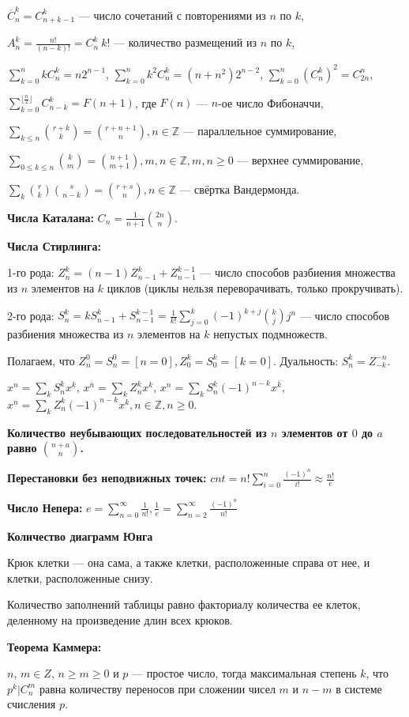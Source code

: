 $\overline{C}_n^k=C_{n + k - 1}^k$ --- число сочетаний с повторениями из $n$ по $k$,

$A_n^k=\frac{n!}{(n-k)!}=C_n^k\:k!$ --- количество размещений из $n$ по $k$,

$\sum\limits_{k=0}^{n}k C_n^k=n2^{n-1}$, $\sum\limits_{k=0}^{n}k^2 C_n^k=(n+n^2)2^{n-2}$,
$\sum\limits_{k=0}^{n}{(C_n^{k})^2}=C_{2n}^n$,

$\sum\limits_{k=0}^{\lfloor\frac{n}{2}\rfloor}C_{n-k}^k=F(n+1)$, где $F(n)$ --- $n$-ое число Фибоначчи,

$\sum\limits_{k\le n} \binom{r+k}{k}=\binom{r+n+1}{n}, n\in \mathbb{Z}$ --- параллельное суммирование,

$\sum\limits_{0\le k\le n} \binom{k}{m} = \binom{n+1}{m+1}, m, n\in \mathbb{Z}, m, n\ge 0$ --- верхнее суммирование,

$\sum\limits_k \binom{r}{k}\binom{s}{n-k}=\binom{r+s}{n}, n\in \mathbb{Z}$ --- свёртка Вандермонда.

\textbf{Числа Каталана:} $\displaystyle C_n = \frac1{n + 1}\binom{2n}{n}$.

\textbf{Числа Стирлинга:}

1-го рода: $Z_n^k =(n-1)Z_{n - 1}^k + Z_{n-1}^{k-1}$ --- число способов разбиения множества из $n$ элементов на $k$ циклов (циклы нельзя переворачивать, только прокручивать).

2-го рода: $S_n^k = kS_{n - 1}^k + S_{n-1}^{k-1} = \frac1{k!} \sum\limits_{j=0}^k (-1)^{k+j}\binom{k}{j}j^n$ --- число способов разбиения множества из $n$ элементов на $k$ непустых подмножеств.

Полагаем, что $Z_n^0=S_n^0=[n=0], Z_0^k=S_0^k=[k=0]$. Дуальность: $S_n^k=Z_{-k}^{-n}$.

$x^n=\sum\limits_k S_n^k x^{\underline{k}}$,
$x^{\overline{n}}=\sum\limits_k Z_n^k x^k$,
$x^n=\sum\limits_k S_n^k (-1)^{n-k} x^{\overline{k}}$,
$x^{\underline{n}}=\sum\limits_k Z_n^k (-1)^{n-k} x^k, n\in \mathbb{Z}, n \ge 0$.

\textbf{Количество неубывающих последовательностей из $n$ элементов от $0$ до $a$ равно $\binom{n + a}{n}$.}

\textbf{Перестановки без неподвижных точек:} $cnt = n! \sum\limits_{i = 0}^n \frac{(-1)^n}{i!} \approx \frac{n!}e$

\textbf{Число Непера:} $e = \sum\limits_{n = 0}^\infty \frac1{n!}, \frac1e = \sum\limits_{n = 2}^\infty \frac{(-1)^n}{n!}$

\textbf{Количество диаграмм Юнга}

Крюк клетки --- она сама, а также клетки, расположенные справа от нее, и клетки, расположенные снизу.

Количество заполнений таблицы равно факториалу количества ее клеток, деленному на произведение длин всех крюков.

\textbf{Теорема Каммера:}

$n$, $m\in Z$, $n\geq  m\geq  0$ и $p$ --- простое число, тогда максимальная степень $k$, что $p^k | C_n^m$ равна количеству переносов при сложении чисел $m$ и $n - m$ в системе счисления $p$.

